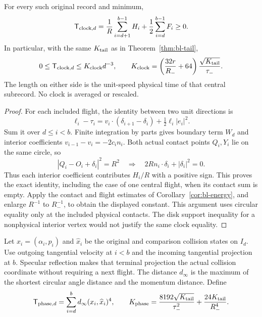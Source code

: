 \begin{theorem}
\label{thm:cp-clock}
For every such original record and minimum,
\begin{equation}\label{eq:cp-clock}
 \mathsf T_{{\rm clock},d}
   =\frac1R\sum_{i=d+1}^{b-1}H_i
                     +\frac12\sum_{i=d}^{b-1}F_i\ge0.
\end{equation}
In particular, with the same $K_{\rm tail}$ as in
Theorem~\ref{thm:bl-tail},
\begin{equation}\label{eq:cp-clock-cost}
 0\le\mathsf T_{{\rm clock},d}\le K_{\rm clock}d^{-3},
 \qquad
 K_{\rm clock}=
 \left(\frac{32r}{R_-}+64\right)
                    \frac{\sqrt{K_{\rm tail}}}{\tau_-}.
\end{equation}
The length on either side is the unit-speed physical time of that
central subrecord.  No clock is averaged or rescaled.
\end{theorem}
\begin{proof}
For each included flight, the identity between two unit directions is
\[
 \ell_i-\tau_i
  =v_i\cdot(\delta_{i+1}-\delta_i)
                                +\tfrac12\ell_i|e_i|^2 .
\]
Sum it over $d\le i<b$.  Finite integration by parts gives boundary
term $W_d$ and interior coefficients $v_{i-1}-v_i=-2c_in_i$.
Both actual contact points $Q_i,Y_i$ lie on the same circle, so
\[
 |Q_i-O_i+\delta_i|^2=R^2
 \quad\Longrightarrow\quad
 2Rn_i\cdot\delta_i+|\delta_i|^2=0 .
\]
Thus each interior coefficient contributes $H_i/R$ with a positive
sign.  This proves the exact identity, including the case of one
central flight, when its contact sum is empty.  Apply the contact
and flight estimates of Corollary~\ref{cor:bl-energy}, and enlarge
$R^{-1}$ to $R_-^{-1}$, to obtain the displayed constant.  This
argument uses circular equality only at the included physical
contacts.  The disk support inequality for a nonphysical interior
vertex would not justify the same clock equality.
\end{proof}

Let $x_i=(\alpha_i,p_i)$ and $\widehat x_i$ be the original and
comparison collision states on $I_d$.  Use outgoing tangential
velocity at $i<b$ and the incoming tangential projection at $b$.
Specular reflection makes that terminal projection the actual
collision coordinate without requiring a next flight.  The distance
$d_\infty$ is the maximum of the shortest circular angle distance
and the momentum distance.  Define
\begin{equation}\label{eq:cp-phase-cost}
 \mathsf T_{{\rm phase},d}
      =\sum_{i=d}^{b}d_\infty(x_i,\widehat x_i)^4,\qquad
 K_{\rm phase}
      =\frac{8192\sqrt{K_{\rm tail}}}{\tau_-^2}
                                      +\frac{24K_{\rm tail}}{R_-^4}.
\end{equation}


